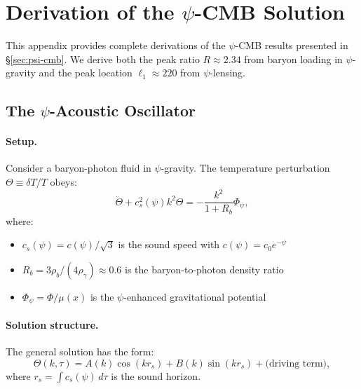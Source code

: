
\section{Derivation of the $\psi$-CMB Solution}\label{app:psi-cmb}

This appendix provides complete derivations of the $\psi$-CMB results presented in \S\ref{sec:psi-cmb}. We derive both the peak ratio $R \approx 2.34$ from baryon loading in $\psi$-gravity and the peak location $\ell_1 \approx 220$ from $\psi$-lensing.

\subsection{The $\psi$-Acoustic Oscillator}\label{app:psi-acoustic}

\paragraph{Setup.}
Consider a baryon-photon fluid in $\psi$-gravity. The temperature perturbation $\Theta \equiv \delta T/T$ obeys:
\begin{equation}\label{eq:app-acoustic}
\ddot{\Theta} + c_s^2(\psi) k^2 \Theta = -\frac{k^2}{1+R_b} \Phi_\psi,
\end{equation}
where:
\begin{itemize}[nosep]
\item $c_s(\psi) = c(\psi)/\sqrt{3}$ is the sound speed with $c(\psi) = c_0 e^{-\psi}$
\item $R_b = 3\rho_b/(4\rho_\gamma) \approx 0.6$ is the baryon-to-photon density ratio
\item $\Phi_\psi = \Phi/\mu(x)$ is the $\psi$-enhanced gravitational potential
\end{itemize}

\paragraph{Solution structure.}
The general solution has the form:
\begin{equation}
\Theta(k,\tau) = A(k) \cos(k r_s) + B(k) \sin(k r_s) + \text{(driving term)},
\end{equation}
where $r_s = \int c_s(\psi)\,d\tau$ is the sound horizon.

